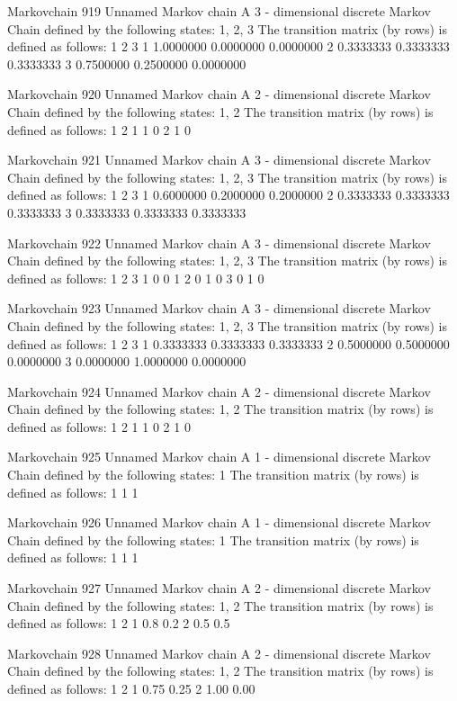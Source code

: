 \documentclass[
  nojss]{jss}
\begin{document}
\begin{CodeChunk}
\begin{CodeOutput}
Markovchain  919 
Unnamed Markov chain 
 A  3 - dimensional discrete Markov Chain defined by the following states: 
 1, 2, 3 
 The transition matrix  (by rows)  is defined as follows: 
          1         2         3
1 1.0000000 0.0000000 0.0000000
2 0.3333333 0.3333333 0.3333333
3 0.7500000 0.2500000 0.0000000

Markovchain  920 
Unnamed Markov chain 
 A  2 - dimensional discrete Markov Chain defined by the following states: 
 1, 2 
 The transition matrix  (by rows)  is defined as follows: 
  1 2
1 1 0
2 1 0

Markovchain  921 
Unnamed Markov chain 
 A  3 - dimensional discrete Markov Chain defined by the following states: 
 1, 2, 3 
 The transition matrix  (by rows)  is defined as follows: 
          1         2         3
1 0.6000000 0.2000000 0.2000000
2 0.3333333 0.3333333 0.3333333
3 0.3333333 0.3333333 0.3333333

Markovchain  922 
Unnamed Markov chain 
 A  3 - dimensional discrete Markov Chain defined by the following states: 
 1, 2, 3 
 The transition matrix  (by rows)  is defined as follows: 
  1 2 3
1 0 0 1
2 0 1 0
3 0 1 0

Markovchain  923 
Unnamed Markov chain 
 A  3 - dimensional discrete Markov Chain defined by the following states: 
 1, 2, 3 
 The transition matrix  (by rows)  is defined as follows: 
          1         2         3
1 0.3333333 0.3333333 0.3333333
2 0.5000000 0.5000000 0.0000000
3 0.0000000 1.0000000 0.0000000

Markovchain  924 
Unnamed Markov chain 
 A  2 - dimensional discrete Markov Chain defined by the following states: 
 1, 2 
 The transition matrix  (by rows)  is defined as follows: 
  1 2
1 1 0
2 1 0

Markovchain  925 
Unnamed Markov chain 
 A  1 - dimensional discrete Markov Chain defined by the following states: 
 1 
 The transition matrix  (by rows)  is defined as follows: 
  1
1 1

Markovchain  926 
Unnamed Markov chain 
 A  1 - dimensional discrete Markov Chain defined by the following states: 
 1 
 The transition matrix  (by rows)  is defined as follows: 
  1
1 1

Markovchain  927 
Unnamed Markov chain 
 A  2 - dimensional discrete Markov Chain defined by the following states: 
 1, 2 
 The transition matrix  (by rows)  is defined as follows: 
    1   2
1 0.8 0.2
2 0.5 0.5

Markovchain  928 
Unnamed Markov chain 
 A  2 - dimensional discrete Markov Chain defined by the following states: 
 1, 2 
 The transition matrix  (by rows)  is defined as follows: 
     1    2
1 0.75 0.25
2 1.00 0.00


\end{CodeOutput}
\end{CodeChunk}
\end{document}
